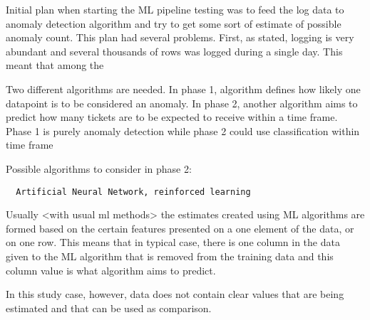 

Initial plan when starting the ML pipeline testing
was to feed the log data to anomaly detection algorithm
and try to get some sort of estimate of possible anomaly count.
This plan had several problems.
First, as stated, logging is very abundant
and several thousands of rows was logged %
during a single day.
This meant that among the

Two different algorithms are needed.
In phase 1,
algorithm defines how likely one datapoint
is to be considered an anomaly.
In phase 2,
another algorithm aims to predict
how many tickets are to be expected to receive
within a time frame.
Phase 1 is purely anomaly detection
while phase 2 could use
classification within time frame

Possible algorithms to consider in phase 2:
\begin{verbatim}
  Artificial Neural Network, reinforced learning
\end{verbatim}


Usually <with usual ml methods> the estimates
created using ML algorithms
are formed based on the certain features
presented on a one element of the data,
or on one row.
This means that in typical case,
there is one column in the data
given to the ML algorithm
that is removed from the training data
and this column value is what algorithm
aims to predict.

In this study case, however,
data does not contain clear values
that are being estimated
and that can be used as comparison.

